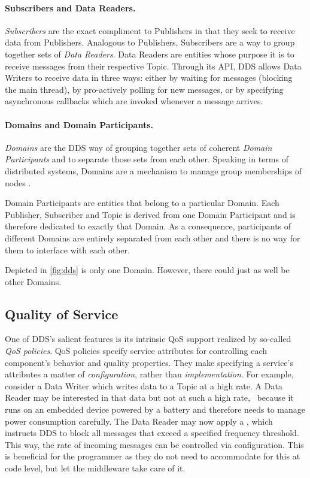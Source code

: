 \paragraph{Subscribers and Data Readers.}
\emph{Subscribers} are the exact compliment to Publishers in that they seek to receive data from Publishers. Analogous to Publishers, Subscribers are a way to group together sets of \emph{Data Readers}. Data Readers are entities whose purpose it is to receive messages from their respective Topic. Through its API, DDS allows Data Writers to receive data in three ways: either by waiting for messages (blocking the main thread), by pro-actively polling for new messages, or by specifying asynchronous callbacks which are invoked whenever a message arrives.

\paragraph{Domains and Domain Participants.}
\emph{Domains} are the DDS way of grouping together sets of coherent \emph{Domain Participants} and to separate those sets from each other. Speaking in terms of distributed systems, Domains are a mechanism to manage group memberships of nodes \cite{tanenbaum2017distributed}. 

Domain Participants are entities that belong to a particular Domain. Each Publisher, Subscriber and Topic is derived from one Domain Participant and is therefore dedicated to exactly that Domain. As a consequence, participants of different Domains are entirely separated from each other and there is no way for them to interface with each other.

Depicted in \autoref{fig:dds} is only one Domain. However, there could just as well be other Domains. 


\subsection{Quality of Service}

One of DDS's salient features is its intrinsic QoS support realized by so-called \emph{QoS policies}. QoS policies specify service attributes for controlling each component's behavior and quality properties. They make specifying a service's attributes a matter of \emph{configuration}, rather than \emph{implementation}. For example, consider  a Data Writer which writes data to a Topic at a high rate. A Data Reader may be interested in that data but not at such a high rate, \eg\ because it runs on an embedded device powered by a battery and therefore needs to manage power consumption carefully. The Data Reader may now apply a \tbf , which instructs DDS to block all messages that exceed a specified frequency threshold. This way, the rate of incoming messages can be controlled via configuration. This is beneficial for the programmer as they do not need to accommodate for this at code level, but let the middleware take care of it.

